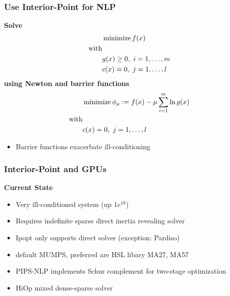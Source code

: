 \begin{frame}[fragile]
  \frametitle{Use Interior-Point for NLP}
  {\bf Solve}
  \begin{align*}
  &\minimize f(x)\\ 
  \text{with}&\\
  &g(x) \geq 0, \ i=1,\dots, m \\
  &c(x) = 0, \ j=1,\dots, l \\
  \end{align*}
  {\bf using Newton and barrier functions}
  \begin{align*}
  &\minimize \phi_\mu := f(x) - \mu \sum^m_{i=1} \ln g(x)\\ 
  \text{with}&\\
  &c(x) = 0, \ j=1,\dots, l 
  \end{align*}
  \begin{itemize}
    \item Barrier functions exacerbate ill-conditioning
  \end{itemize}
\end{frame}

\begin{frame}[fragile]
  \frametitle{Interior-Point and GPUs}
  {\bf Current State}
  \begin{itemize}
    \item Very ill-conditioned system (up $1e^{16}$)
    \item Requires indefinite sparse direct inertia revealing solver
    \item Ipopt only supports direct solver (exception: Pardiso)
    \item default MUMPS, preferred are HSL libary MA27, MA57 
    \item PIPS-NLP implements Schur complement for two-stage optimization
    \item HiOp mixed dense-sparse solver 
  \end{itemize}
\end{frame}



